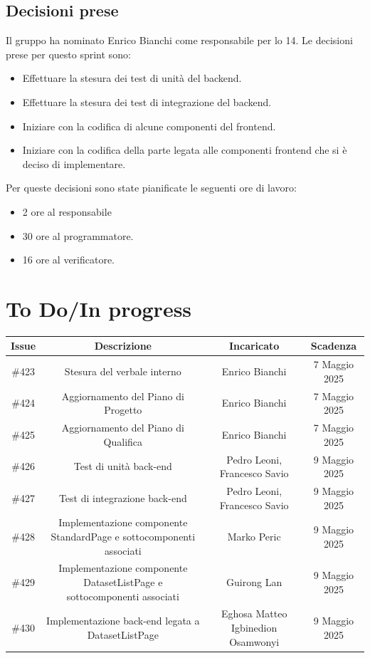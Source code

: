 \documentclass[a4paper, 12pt]{article}
\begin{document}
\subsection{Decisioni prese}
    Il gruppo ha nominato Enrico Bianchi come responsabile per lo  14.
    Le decisioni prese per questo sprint sono:
    \begin{itemize}
        \item Effettuare la stesura dei test di unità del backend.
        \item Effettuare la stesura dei test di integrazione del backend.
        \item Iniziare con la codifica di alcune componenti del frontend.
        \item Iniziare con la codifica della parte legata alle componenti frontend che si è deciso di implementare.
    \end{itemize}
    Per queste decisioni sono state pianificate le seguenti ore di lavoro:
    \begin{itemize}  
        \item 2 ore al responsabile
        \item 30 ore al programmatore.
        \item 16 ore al verificatore.
    \end{itemize}

\section{To Do/In progress}
\begin{tabularx}{\textwidth}{|c|C|C|C|}
    \hline
        \textbf{Issue} & \textbf{Descrizione} & \textbf{Incaricato} & \textbf{Scadenza}\\
    \hline 
        \#423 & Stesura del verbale interno & Enrico Bianchi & 7 Maggio 2025\\
    \hline
        \#424 & Aggiornamento del Piano di Progetto & Enrico Bianchi & 7 Maggio 2025\\
    \hline
        \#425 & Aggiornamento del Piano di Qualifica & Enrico Bianchi & 7 Maggio 2025\\
    \hline
        \#426 & Test di unità back-end & Pedro Leoni, Francesco Savio & 9 Maggio 2025\\
    \hline
        \#427 & Test di integrazione back-end & Pedro Leoni, Francesco Savio & 9 Maggio 2025\\
    \hline
        \#428 & Implementazione componente StandardPage e sottocomponenti associati & Marko Peric & 9 Maggio 2025\\
    \hline
        \#429 & Implementazione componente DatasetListPage e sottocomponenti associati & Guirong Lan & 9 Maggio 2025\\
    \hline
        \#430 & Implementazione back-end legata a DatasetListPage & Eghosa Matteo Igbinedion Osamwonyi & 9 Maggio 2025\\
    \hline
    \end{tabularx}
\end{document}
